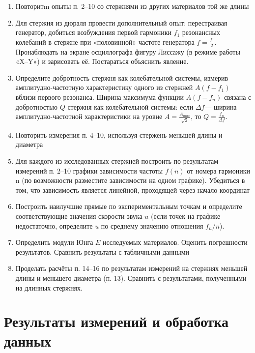 \documentclass[a4paper]{article}
\begin{document}
\begin{enumerate}
\item Повторитm опыты п. 2–10 со стержнями из других материалов той же длины
\item Для стержня из дюраля провести дополнительный опыт: перестраивая генератор, добиться возбуждения первой гармоники $f_1$ резонансных колебаний в стержне при «половинной» частоте генератора $f=\frac{f_1}{2}$. Пронаблюдать на экране осциллографа фигуру Лиссажу (в режиме работы «X–Y») и зарисовать её. Постараться объяснить явление.
\item Определите добротность стержня как колебательной системы, измерив амплитудно-частотную характеристику одного из стержней $A(f-f_1)$ вблизи первого резонанса.
Ширина максимума функции $A(f-f_n)$ связана с добротностью $Q$ стержня как колебательной системы: если $\Delta f$— ширина амплитудно-частотной характеристики на уровне $A=\frac{A_{max}}{\sqrt{2}}$, то $Q=\frac{f_n}{\Delta f}$.
\item Повторить измерения п. 4–10, используя стержень меньшей длины и диаметра
\item Для каждого из исследованных стержней построить по результатам
измерений п. 2–10 графики зависимости частоты $f(n)$ от номера гармоники
n (по возможности разместите зависимости на одном графике). Убедиться
в том, что зависимость является линейной, проходящей через начало координат
\item Построить наилучшие прямые по экспериментальным точкам и
определите соответствующие значения скорости звука $u$ (если точек на графике недостаточно, определите $u$ по среднему значению отношения $f_n/n$).
\item Определить модули Юнга $E$ исследуемых материалов. Оценить
погрешности результатов. Сравнить результаты с табличными данными
\item Проделать расчёты п. 14–16 по результатам измерений на стержнях меньшей длины и меньшего диаметра (п. 13). Сравнить с результатами, полученными на длинных стержнях.
\end{enumerate}

\section{Результаты измерений и обработка данных}
\end{document}
